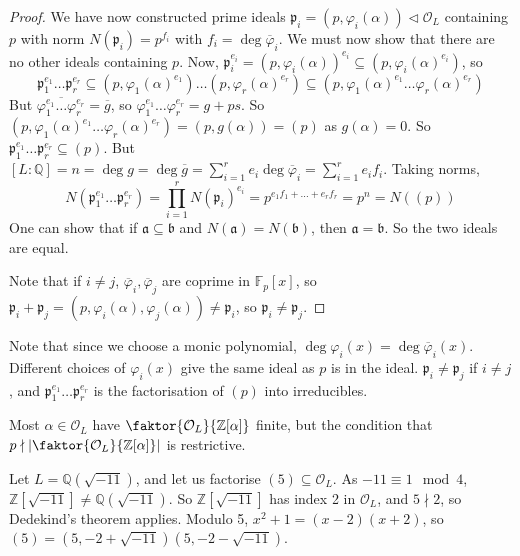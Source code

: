 \begin{proof}
    We have now constructed prime ideals \( \mathfrak p_i = (p, \varphi_i(\alpha)) \triangleleft \mathcal O_L \) containing \( p \) with norm \( N(\mathfrak p_i) = p^{f_i} \) with \( f_i = \deg \overline\varphi_i \).
    We must now show that there are no other ideals containing \( p \).
    Now, \( \mathfrak p_i^{e_i} = (p, \varphi_i(\alpha))^{e_i} \subseteq (p, \varphi_i(\alpha)^{e_i}) \), so
    \[ \mathfrak p_1^{e_1} \dots \mathfrak p_r^{e_r} \subseteq (p, \varphi_1(\alpha)^{e_1}) \dots (p, \varphi_r(\alpha)^{e_r}) \subseteq (p, \varphi_1(\alpha)^{e_1} \dots \varphi_r(\alpha)^{e_r}) \]
    But \( \overline{\varphi_1^{e_1} \dots \varphi_r^{e_r}} = \overline g \), so \( \varphi_1^{e_1} \dots \varphi_r^{e_r} = g + p s \).
    So \( (p, \varphi_1(\alpha)^{e_1} \dots \varphi_r(\alpha)^{e_r}) = (p, g(\alpha)) = (p) \) as \( g(\alpha) = 0 \).
    So \( \mathfrak p_1^{e_1} \dots \mathfrak p_r^{e_r} \subseteq (p) \).
    But \( [L:\mathbb Q] = n = \deg g = \deg \overline g = \sum_{i=1}^r e_i \deg \overline\varphi_i = \sum_{i=1}^r e_i f_i \).
    Taking norms,
    \[ N(\mathfrak p_1^{e_1} \dots \mathfrak p_r^{e_r}) = \prod_{i=1}^r N(\mathfrak p_i)^{e_i} = p^{e_1 f_1 + \dots + e_r f_r} = p^n = N((p)) \]
    One can show that if \( \mathfrak a \subseteq \mathfrak b \) and \( N(\mathfrak a) = N(\mathfrak b) \), then \( \mathfrak a = \mathfrak b \).
    So the two ideals are equal.

    Note that if \( i \neq j \), \( \overline \varphi_i, \overline \varphi_j \) are coprime in \( \mathbb F_p[x] \), so \( \mathfrak p_i + \mathfrak p_j = (p, \varphi_i(\alpha), \varphi_j(\alpha)) \neq \mathfrak p_i \), so \( \mathfrak p_i \neq \mathfrak p_j \).
\end{proof}
Note that since we choose a monic polynomial, \( \deg \varphi_i(x) = \deg \overline \varphi_i(x) \).
Different choices of \( \varphi_i(x) \) give the same ideal as \( p \) is in the ideal.
\( \mathfrak p_i \neq \mathfrak p_j \) if \( i \neq j \), and \( \mathfrak p_1^{e_1} \dots \mathfrak p_r^{e_r} \) is the factorisation of \( (p) \) into irreducibles.
\begin{remark}
    Most \( \alpha \in \mathcal O_L \) have \( \faktor{\mathcal O_L}{\mathbb Z[\alpha]} \) finite, but the condition that \( p \nmid \abs{\faktor{\mathcal O_L}{\mathbb Z[\alpha]}} \) is restrictive.
\end{remark}
\begin{example}
    Let \( L = \mathbb Q(\sqrt{-11}) \), and let us factorise \( (5) \subseteq \mathcal O_L \).
    As \( -11 \equiv 1 \mod 4 \), \( \mathbb Z[\sqrt{-11}] \neq \mathbb Q(\sqrt{-11}) \).
    So \( \mathbb Z[\sqrt{-11}] \) has index 2 in \( \mathcal O_L \), and \( 5 \nmid 2 \), so Dedekind's theorem applies.
    Modulo 5, \( x^2 + 1 = (x-2)(x+2) \), so \( (5) = (5, -2 + \sqrt{-11})(5, -2 - \sqrt{-11}) \).
\end{example}
